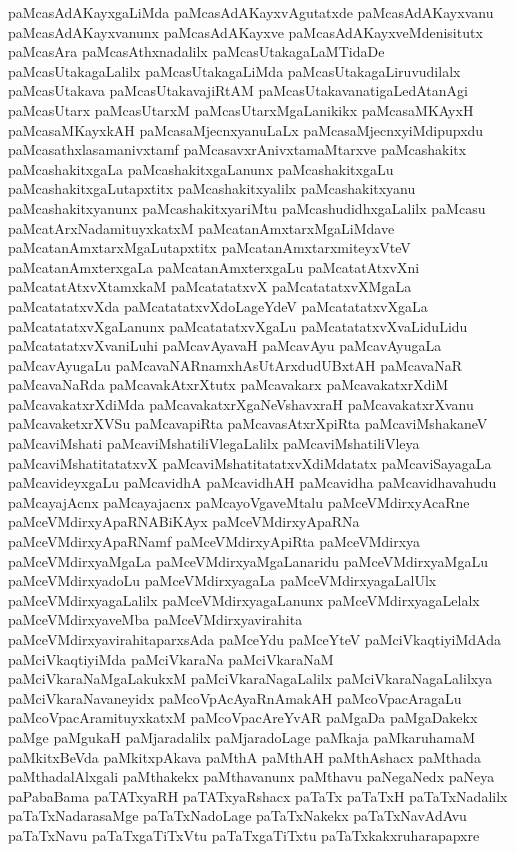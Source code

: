 {paMcasAdAKayxgaLiMda
paMcasAdAKayxvAgutatxde
paMcasAdAKayxvanu
paMcasAdAKayxvanunx
paMcasAdAKayxve
paMcasAdAKayxveMdenisitutx
paMcasAra
paMcasAthxnadalilx
paMcasUtakagaLaMTidaDe
paMcasUtakagaLalilx
paMcasUtakagaLiMda
paMcasUtakagaLiruvudilalx
paMcasUtakava
paMcasUtakavajiRtAM
paMcasUtakavanatigaLedAtanAgi
paMcasUtarx
paMcasUtarxM
paMcasUtarxMgaLanikikx
paMcasaMKAyxH
paMcasaMKayxkAH
paMcasaMjecnxyanuLaLx
paMcasaMjecnxyiMdipupxdu
paMcasathxlasamanivxtamf
paMcasavxrAnivxtamaMtarxve
paMcashakitx
paMcashakitxgaLa
paMcashakitxgaLanunx
paMcashakitxgaLu
paMcashakitxgaLutapxtitx
paMcashakitxyalilx
paMcashakitxyanu
paMcashakitxyanunx
paMcashakitxyariMtu
paMcashudidhxgaLalilx
paMcasu
paMcatArxNadamituyxkatxM
paMcatanAmxtarxMgaLiMdave
paMcatanAmxtarxMgaLutapxtitx
paMcatanAmxtarxmiteyxVteV
paMcatanAmxterxgaLa
paMcatanAmxterxgaLu
paMcatatAtxvXni
paMcatatAtxvXtamxkaM
paMcatatatxvX
paMcatatatxvXMgaLa
paMcatatatxvXda
paMcatatatxvXdoLageYdeV
paMcatatatxvXgaLa
paMcatatatxvXgaLanunx
paMcatatatxvXgaLu
paMcatatatxvXvaLiduLidu
paMcatatatxvXvaniLuhi
paMcavAyavaH
paMcavAyu
paMcavAyugaLa
paMcavAyugaLu
paMcavaNARnamxhAsUtArxdudUBxtAH
paMcavaNaR
paMcavaNaRda
paMcavakAtxrXtutx
paMcavakarx
paMcavakatxrXdiM
paMcavakatxrXdiMda
paMcavakatxrXgaNeVshavxraH
paMcavakatxrXvanu
paMcavaketxrXVSu
paMcavapiRta
paMcavasAtxrXpiRta
paMcaviMshakaneV
paMcaviMshati
paMcaviMshatiliVlegaLalilx
paMcaviMshatiliVleya
paMcaviMshatitatatxvX
paMcaviMshatitatatxvXdiMdatatx
paMcaviSayagaLa
paMcavideyxgaLu
paMcavidhA
paMcavidhAH
paMcavidha
paMcavidhavahudu
paMcayajAcnx
paMcayajacnx
paMcayoVgaveMtalu
paMceVMdirxyAcaRne
paMceVMdirxyApaRNABiKAyx
paMceVMdirxyApaRNa
paMceVMdirxyApaRNamf
paMceVMdirxyApiRta
paMceVMdirxya
paMceVMdirxyaMgaLa
paMceVMdirxyaMgaLanaridu
paMceVMdirxyaMgaLu
paMceVMdirxyadoLu
paMceVMdirxyagaLa
paMceVMdirxyagaLalUlx
paMceVMdirxyagaLalilx
paMceVMdirxyagaLanunx
paMceVMdirxyagaLelalx
paMceVMdirxyaveMba
paMceVMdirxyavirahita
paMceVMdirxyavirahitaparxsAda
paMceYdu
paMceYteV
paMciVkaqtiyiMdAda
paMciVkaqtiyiMda
paMciVkaraNa
paMciVkaraNaM
paMciVkaraNaMgaLakukxM
paMciVkaraNagaLalilx
paMciVkaraNagaLalilxya
paMciVkaraNavaneyidx
paMcoVpAcAyaRnAmakAH
paMcoVpacAragaLu
paMcoVpacAramituyxkatxM
paMcoVpacAreYvAR
paMgaDa
paMgaDakekx
paMge
paMgukaH
paMjaradalilx
paMjaradoLage
paMkaja
paMkaruhamaM
paMkitxBeVda
paMkitxpAkava
paMthA
paMthAH
paMthAshacx
paMthada
paMthadalAlxgali
paMthakekx
paMthavanunx
paMthavu
paNegaNedx
paNeya
paPabaBama
paTATxyaRH
paTATxyaRshacx
paTaTx
paTaTxH
paTaTxNadalilx
paTaTxNadarasaMge
paTaTxNadoLage
paTaTxNakekx
paTaTxNavAdAvu
paTaTxNavu
paTaTxgaTiTxVtu
paTaTxgaTiTxtu
paTaTxkakxruharapapxre
}
